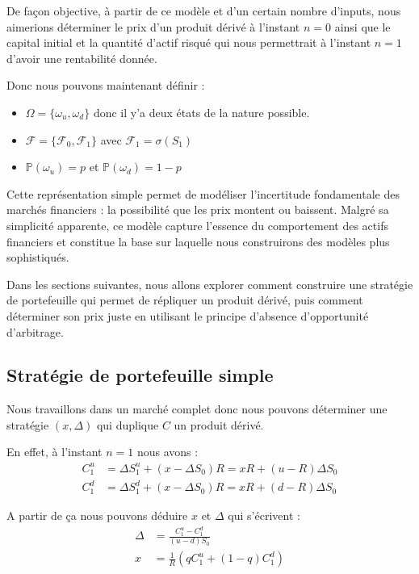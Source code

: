 \documentclass[12pt,a4paper]{report}
\begin{document}
De façon objective, à partir de ce modèle et d'un certain nombre d'inputs, nous aimerions déterminer le prix d'un produit dérivé à l'instant $n=0$ ainsi que le capital initial et la quantité d'actif risqué qui nous permettrait à l'instant $n=1$ d'avoir une rentabilité donnée.

Donc nous pouvons maintenant définir :
\begin{itemize}
    \item $\Omega = \{\omega_u, \omega_d\}$ donc il y'a deux états de la nature possible.
    \item $\mathcal{F} = \{\mathcal{F}_0, \mathcal{F}_1\}$ avec $\mathcal{F}_1 = \sigma(S_1)$
    \item $\mathbb{P}(\omega_u) = p$ et $\mathbb{P}(\omega_d) = 1 - p$
\end{itemize}

Cette représentation simple permet de modéliser l'incertitude fondamentale des marchés financiers : la possibilité que les prix montent ou baissent. Malgré sa simplicité apparente, ce modèle capture l'essence du comportement des actifs financiers et constitue la base sur laquelle nous construirons des modèles plus sophistiqués.

Dans les sections suivantes, nous allons explorer comment construire une stratégie de portefeuille qui permet de répliquer un produit dérivé, puis comment déterminer son prix juste en utilisant le principe d'absence d'opportunité d'arbitrage.




  \subsection{Stratégie de portefeuille simple}

Nous travaillons dans un marché complet donc nous pouvons déterminer une stratégie $(x, \Delta)$ qui duplique $C$ un produit dérivé.

En effet, à l'instant $n=1$ nous avons :
\begin{align*}
C_1^u &= \Delta S_1^u + (x - \Delta S_0)R = xR + (u-R)\Delta S_0 \\
C_1^d &= \Delta S_1^d + (x - \Delta S_0)R = xR + (d-R)\Delta S_0
\end{align*}

A partir de ça nous pouvons déduire $x$ et $\Delta$ qui s'écrivent :
\begin{align*}
\Delta &= \frac{C_1^u - C_1^d}{(u - d)S_0} \\
 x &= \frac{1}{R} \left( qC_1^u + (1 - q)C_1^d \right)
\end{align*}
\end{document}
